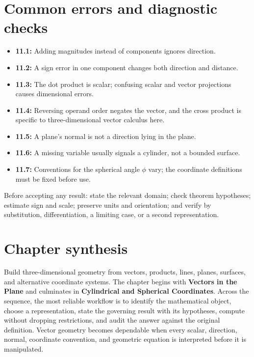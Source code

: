 \documentclass[11pt]{article}
\begin{document}
\section{Common errors and diagnostic checks}
\begin{warningbox}
\begin{itemize}
\item \textbf{11.1:} Adding magnitudes instead of components ignores direction.
\item \textbf{11.2:} A sign error in one component changes both direction and distance.
\item \textbf{11.3:} The dot product is scalar; confusing scalar and vector projections causes dimensional errors.
\item \textbf{11.4:} Reversing operand order negates the vector, and the cross product is specific to three-dimensional vector calculus here.
\item \textbf{11.5:} A plane's normal is not a direction lying in the plane.
\item \textbf{11.6:} A missing variable usually signals a cylinder, not a bounded surface.
\item \textbf{11.7:} Conventions for the spherical angle $\phi$ vary; the coordinate definitions must be fixed before use.
\end{itemize}
\end{warningbox}
\begin{checkbox}
Before accepting any result: state the relevant domain; check theorem hypotheses; estimate sign and scale; preserve units and orientation; and verify by substitution, differentiation, a limiting case, or a second representation.
\end{checkbox}

\section{Chapter synthesis}
Build three-dimensional geometry from vectors, products, lines, planes, surfaces, and alternative coordinate systems. The chapter begins with \textbf{Vectors in the Plane} and culminates in \textbf{Cylindrical and Spherical Coordinates}. Across the sequence, the most reliable workflow is to identify the mathematical object, choose a representation, state the governing result with its hypotheses, compute without dropping restrictions, and audit the answer against the original definition. Vector geometry becomes dependable when every scalar, direction, normal, coordinate convention, and geometric equation is interpreted before it is manipulated.
\end{document}
